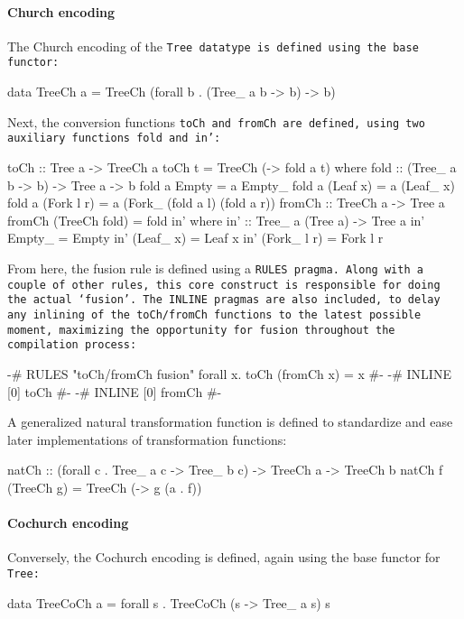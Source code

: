 \paragraph{Church encoding} The Church encoding of the \tt{Tree} datatype is defined using the base functor:
\begin{code}
data TreeCh a = TreeCh (forall b . (Tree_ a b -> b) -> b)
\end{code}
Next, the conversion functions \tt{toCh} and \tt{fromCh} are defined, using two auxiliary functions \tt{fold} and \tt{in'}:
\begin{code}
toCh :: Tree a -> TreeCh a
toCh t = TreeCh (\a -> fold a t)
  where fold :: (Tree_ a b -> b) -> Tree a -> b
        fold a Empty      = a Empty_
        fold a (Leaf x)   = a (Leaf_ x)
        fold a (Fork l r) = a (Fork_ (fold a l)
                             (fold a r))
fromCh :: TreeCh a -> Tree a
fromCh (TreeCh fold) = fold in'
  where in' :: Tree_ a (Tree a) -> Tree a
        in' Empty_ = Empty
        in' (Leaf_ x) = Leaf x
        in' (Fork_ l r) = Fork l r
\end{code}
From here, the fusion rule is defined using a \tt{RULES} pragma. Along with a couple of other rules, this core construct is responsible for doing the actual `fusion'.
The \tt{INLINE} pragmas are also included, to delay any inlining of the \tt{toCh/fromCh} functions to the latest possible moment, maximizing the opportunity for fusion throughout the compilation process:
\begin{code}
{-# RULES "toCh/fromCh fusion" forall x. toCh (fromCh x) = x #-}
{-# INLINE [0] toCh #-}
{-# INLINE [0] fromCh #-}
\end{code}
A generalized natural transformation function is defined to standardize and ease later implementations of transformation functions:
\begin{code}
natCh :: (forall c . Tree_ a c -> Tree_ b c) -> TreeCh a -> TreeCh b
natCh f (TreeCh g) = TreeCh (\a -> g (a . f))
\end{code}
\paragraph{Cochurch encoding} Conversely, the Cochurch encoding is defined, again using the base functor for \tt{Tree}:
\begin{code}
data TreeCoCh a = forall s . TreeCoCh (s -> Tree_ a s) s
\end{code}

